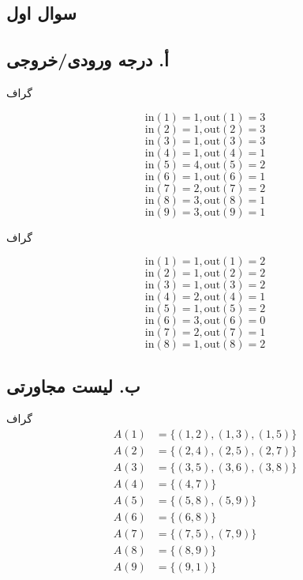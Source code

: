 \documentclass{article}
\begin{document}
\begin{multicols}{2}
\section*{سوال اول}

\subsection*{أ. درجه ورودی/خروجی}
گراف 
\begin{LTR}
$$\text{in} \left( 1 \right) = 1, \text{out} \left( 1 \right) = 3$$
$$\text{in} \left( 2 \right) = 1, \text{out} \left( 2 \right) = 3$$
$$\text{in} \left( 3 \right) = 1, \text{out} \left( 3 \right) = 3$$
$$\text{in} \left( 4 \right) = 1, \text{out} \left( 4 \right) = 1$$
$$\text{in} \left( 5 \right) = 4, \text{out} \left( 5 \right) = 2$$
$$\text{in} \left( 6 \right) = 1, \text{out} \left( 6 \right) = 1$$
$$\text{in} \left( 7 \right) = 2, \text{out} \left( 7 \right) = 2$$
$$\text{in} \left( 8 \right) = 3, \text{out} \left( 8 \right) = 1$$
$$\text{in} \left( 9 \right) = 3, \text{out} \left( 9 \right) = 1$$
\end{LTR}

گراف 
\begin{LTR}
$$\text{in} \left( 1 \right) = 1, \text{out} \left( 1 \right) = 2$$
$$\text{in} \left( 2 \right) = 1, \text{out} \left( 2 \right) = 2$$
$$\text{in} \left( 3 \right) = 1, \text{out} \left( 3 \right) = 2$$
$$\text{in} \left( 4 \right) = 2, \text{out} \left( 4 \right) = 1$$
$$\text{in} \left( 5 \right) = 1, \text{out} \left( 5 \right) = 2$$
$$\text{in} \left( 6 \right) = 3, \text{out} \left( 6 \right) = 0$$
$$\text{in} \left( 7 \right) = 2, \text{out} \left( 7 \right) = 1$$
$$\text{in} \left( 8 \right) = 1, \text{out} \left( 8 \right) = 2$$
\end{LTR}

\subsection*{ب. لیست مجاورتی}
گراف 
\begin{align*}
A( 1 ) &= \{( 1, 2 ), ( 1, 3 ), ( 1, 5 ) \}\\
A( 2 ) &= \{( 2, 4 ), ( 2, 5 ), ( 2, 7 ) \}\\
A( 3 ) &= \{( 3, 5 ), ( 3, 6 ), ( 3, 8 ) \}\\
A( 4 ) &= \{( 4, 7 ) \}\\
A( 5 ) &= \{( 5, 8 ), ( 5, 9 ) \}\\
A( 6 ) &= \{( 6, 8 ) \}\\
A( 7 ) &= \{( 7, 5 ), ( 7, 9 ) \}\\
A( 8 ) &= \{( 8, 9 ) \}\\
A( 9 ) &= \{( 9, 1 ) \}
\end{align*}


\end{multicols}
\end{document}
